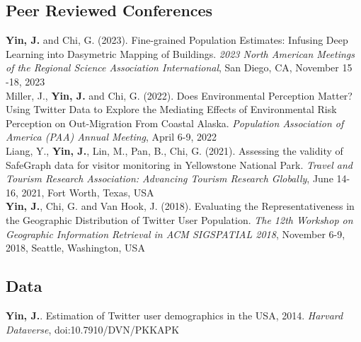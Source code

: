 \documentclass[11pt, a4paper]{article}
\newcommand{\years}[1]{\marginnote{\scriptsize #1}}
\begin{document}
\subsection*{Peer Reviewed Conferences}
\years{2023}\textbf{Yin, J.} and Chi, G. (2023). Fine-grained Population Estimates: Infusing Deep Learning into Dasymetric Mapping of Buildings. \textit{2023 North American Meetings of the Regional Science Association International}, San Diego, CA, November 15 -18, 2023\\
\years{2022}Miller, J., \textbf{Yin, J.} and Chi, G. (2022). Does Environmental Perception Matter? Using Twitter Data to Explore the Mediating Effects of Environmental Risk Perception on Out-Migration From Coastal Alaska. \textit{Population Association of America (PAA) Annual Meeting}, April 6-9, 2022\\
\years{2021}Liang, Y., \textbf{Yin, J.}, Lin, M., Pan, B., Chi, G. (2021). Assessing the validity of SafeGraph data for visitor monitoring in Yellowstone National Park. \textit{ Travel and Tourism Research Association: Advancing Tourism Research Globally}, June 14-16, 2021, Fort Worth, Texas, USA\\
\years{2018}\textbf{Yin, J.}, Chi, G. and Van Hook, J. (2018). Evaluating the Representativeness in the Geographic Distribution of Twitter User Population. \textit{The 12th Workshop on Geographic Information Retrieval in ACM SIGSPATIAL 2018}, November 6-9, 2018, Seattle, Washington, USA

\subsection*{Data}
\years{2020}\textbf{Yin, J.}. Estimation of Twitter user demographics in the USA, 2014. \textit{Harvard Dataverse}, doi:10.7910/DVN/PKKAPK
\end{document}
